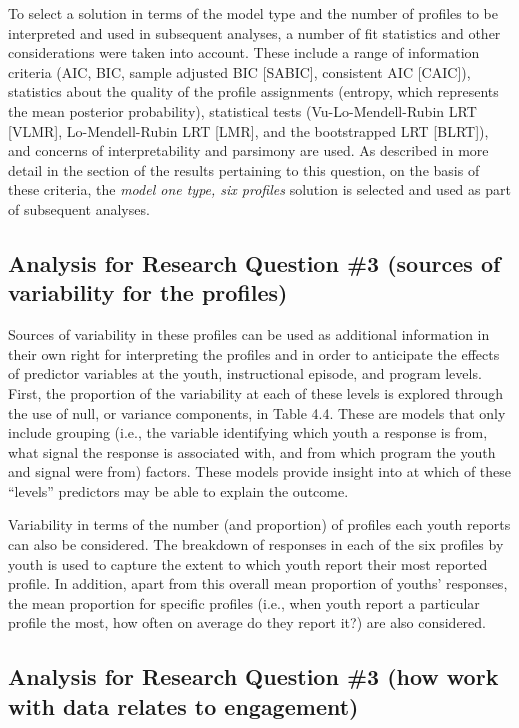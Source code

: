 \documentclass[]{book}
\theoremstyle{definition}
\theoremstyle{definition}
\theoremstyle{definition}
\theoremstyle{remark}
\begin{document}
To select a solution in terms of the model type and the number of
profiles to be interpreted and used in subsequent analyses, a number of
fit statistics and other considerations were taken into account. These
include a range of information criteria (AIC, BIC, sample adjusted BIC
{[}SABIC{]}, consistent AIC {[}CAIC{]}), statistics about the quality of
the profile assignments (entropy, which represents the mean posterior
probability), statistical tests (Vu-Lo-Mendell-Rubin LRT {[}VLMR{]},
Lo-Mendell-Rubin LRT {[}LMR{]}, and the bootstrapped LRT {[}BLRT{]}),
and concerns of interpretability and parsimony are used. As described in
more detail in the section of the results pertaining to this question,
on the basis of these criteria, the \emph{model one type, six profiles}
solution is selected and used as part of subsequent analyses.

\subsection{Analysis for Research Question \#3 (sources of variability
for the
profiles)}\label{analysis-for-research-question-3-sources-of-variability-for-the-profiles}

Sources of variability in these profiles can be used as additional
information in their own right for interpreting the profiles and in
order to anticipate the effects of predictor variables at the youth,
instructional episode, and program levels. First, the proportion of the
variability at each of these levels is explored through the use of null,
or variance components, in Table 4.4. These are models that only include
grouping (i.e., the variable identifying which youth a response is from,
what signal the response is associated with, and from which program the
youth and signal were from) factors. These models provide insight into
at which of these ``levels'' predictors may be able to explain the
outcome.

Variability in terms of the number (and proportion) of profiles each
youth reports can also be considered. The breakdown of responses in each
of the six profiles by youth is used to capture the extent to which
youth report their most reported profile. In addition, apart from this
overall mean proportion of youths' responses, the mean proportion for
specific profiles (i.e., when youth report a particular profile the
most, how often on average do they report it?) are also considered.

\subsection{Analysis for Research Question \#3 (how work with data
relates to
engagement)}\label{analysis-for-research-question-3-how-work-with-data-relates-to-engagement}
\end{document}
